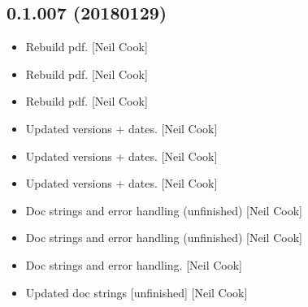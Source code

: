 \documentclass[a4paper,10pt,english]{report}
\begin{document}
\subsection{0.1.007 (2018\sphinxhyphen{}01\sphinxhyphen{}29)}
\label{\detokenize{misc/changelog:id515}}\begin{itemize}
\item {} 
Rebuild pdf. {[}Neil Cook{]}

\item {} 
Rebuild pdf. {[}Neil Cook{]}

\item {} 
Rebuild pdf. {[}Neil Cook{]}

\item {} 
Updated versions + dates. {[}Neil Cook{]}

\item {} 
Updated versions + dates. {[}Neil Cook{]}

\item {} 
Updated versions + dates. {[}Neil Cook{]}

\item {} 
Doc strings and error handling (unfinished) {[}Neil Cook{]}

\item {} 
Doc strings and error handling (unfinished) {[}Neil Cook{]}

\item {} 
Doc strings and error handling. {[}Neil Cook{]}

\item {} 
Updated doc strings {[}unfinished{]} {[}Neil Cook{]}

\end{itemize}
\end{document}
